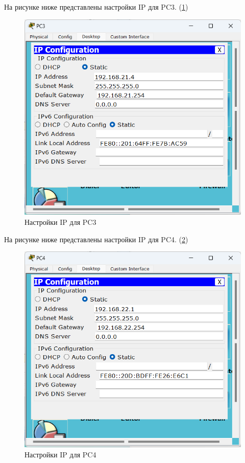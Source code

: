 \documentclass[14pt]{extarticle}
\begin{document}
На рисунке ниже представлены настройки IP для PC3. (\ref{img:PC3})

\begin{figure}[H]
    \centering
    \includegraphics[width=1.0\linewidth]{PC3.png}
    \caption{Настройки IP для PC3\label{img:PC3}}
\end{figure}

На рисунке ниже представлены настройки IP для PC4. (\ref{img:PC4})

\begin{figure}[H]
    \centering
    \includegraphics[width=1.0\linewidth]{PC4.png}
    \caption{Настройки IP для PC4\label{img:PC4}}
\end{figure}
\end{document}
